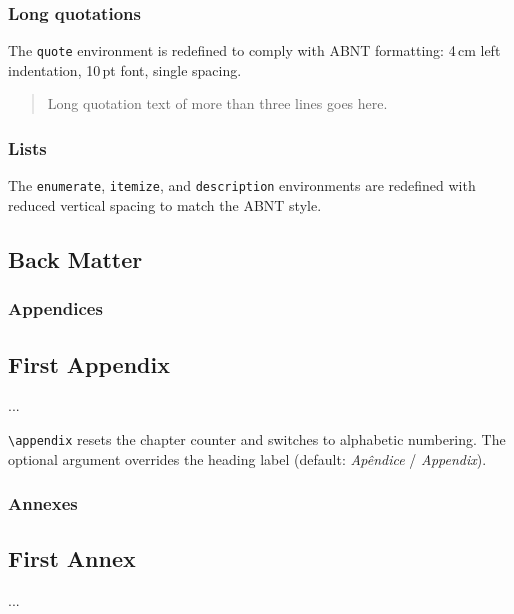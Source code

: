 \documentclass[11pt,a4paper]{article}
\newcommand{\cmd}[1]{\texttt{\textbackslash #1}}
\newcommand{\env}[1]{\texttt{#1}}
\begin{document}
\subsection{Long quotations}

The \env{quote} environment is redefined to comply with ABNT formatting:
4\,cm left indentation, 10\,pt font, single spacing.

\begin{latex}
\begin{quote}
  Long quotation text of more than three lines goes here.
\end{quote}
\end{latex}

\subsection{Lists}

The \env{enumerate}, \env{itemize}, and \env{description} environments
are redefined with reduced vertical spacing to match the ABNT style.

\section{Back Matter}
\label{sec:backmatter}

\subsection{Appendices}

\begin{latex}
\appendix
\chapter{First Appendix}
...
\end{latex}

\cmd{appendix} resets the chapter counter and switches to alphabetic
numbering.  The optional argument overrides the heading label
(default: \textit{Apêndice} / \textit{Appendix}).

\subsection{Annexes}

\begin{latex}
\annex
\chapter{First Annex}
...
\end{latex}
\end{document}

